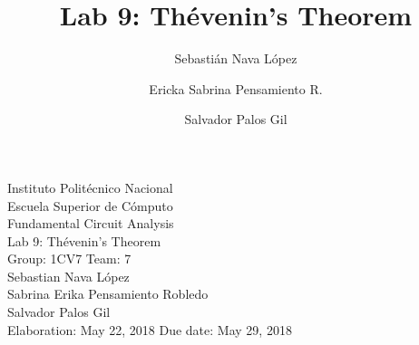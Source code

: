 \documentclass[letterpaper]{article}
\title{Lab 9: Thévenin's Theorem}
\author{
    Sebastián Nava López\\
    \and
    Ericka Sabrina Pensamiento R.\\
    \and
    Salvador Palos Gil
}
\begin{document}
\begin{titlepage}
    \centering
    {\Huge Instituto Politécnico Nacional}\\[3ex]
    {\huge Escuela Superior de Cómputo}\\[8ex]
    {\huge Fundamental Circuit Analysis}\\[12ex]
    {\Large Lab 9: Thévenin's Theorem}\\[20ex]
    {\Large Group: 1CV7 Team: 7 \\[8ex]
    Sebastian Nava López\\[4ex]
    Sabrina Erika Pensamiento Robledo\\[4ex]
    Salvador Palos Gil\\[18ex]
    }
    \large{Elaboration: May 22, 2018\hspace{8em} Due date: May 29, 2018}
\end{titlepage}
\tableofcontents
\newpage
\end{document}
